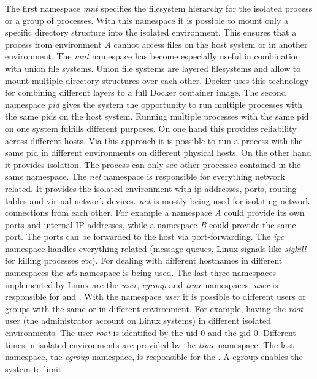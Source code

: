 \documentclass[titlepage]{report}
\begin{document}
The first namespace \emph{mnt} specifies the filesystem hierarchy for the isolated process or a group of processes. With this namespace it is possible
to mount only a specific directory structure into the isolated environment. This ensures that a process from environment \emph{A} cannot
access files on the host system or in another environment. The \emph{mnt} namespace has become especially useful in combination with union file systems.
Union file systems are layered filesystems and allow to mount multiple directory structures over each other. Docker uses this technology for combining
different layers to a full Docker container image. The second namespace \emph{pid} gives the system the opportunity to run multiple processes 
with the same \glspl{pid} on the host system. Running multiple processes with the same \gls{pid} on one system fulfills different purposes.
On one hand this provides reliability across different hosts. Via this approach it is possible to run a process with the same \gls{pid} in different
environments on different physical hosts. On the other hand it provides isolation. The process can only see other processes contained in the same namespace\cite{lwnnamespace}.
The \emph{net} namespace is responsible for everything network related. It provides the isolated environment with \gls{ip} addresses, ports, routing tables
and virtual network devices. \emph{net} is mostly being used for isolating network connections from each other. For example a namespace \emph{A} could provide
its own ports and internal IP addresses, while a namespace \emph{B} could provide the same port. The ports can be forwarded to the host via port-forwarding.
The \emph{ipc} namespace handles everything  related (message queues, Linux signals like \emph{sigkill} for killing processes etc).
For dealing with different hostnames in different namespaces the \emph{uts} namespace is being used. The last three namespaces implemented by Linux
are the \emph{user}, \emph{cgroup} and \emph{time} namespaces. \emph{user} is responsible for  and . With
the namespace \emph{user} it is possible to different users or groups with the same  or  in different environment.
For example, having the \emph{root} user (the administrator account on Linux systems) in different isolated environments. The user \emph{root}
is identified by the \gls{uid} 0 and the \gls{gid} 0. Different times in isolated environments are provided by the \emph{time} namespace.
The last namespace, the \emph{cgroup} namespace, is responsible for the . A \gls{cgroup} enables the system to limit
\end{document}
